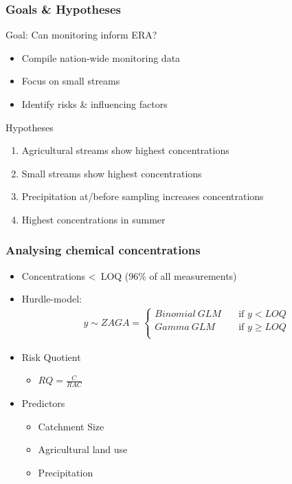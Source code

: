 \documentclass[
	10pt
	]{beamer}
\begin{document}
\begin{frame}
\frametitle{Goals \& Hypotheses}
	\begin{exampleblock}{Goal: Can monitoring inform ERA?}
		\begin{itemize}
			\item Compile nation-wide monitoring data %
			\item Focus on small streams %
			\item Identify risks \& influencing factors
		\end{itemize}
	\end{exampleblock}
	\pause
	\begin{exampleblock}{Hypotheses}
		\begin{enumerate}
			\item Agricultural streams show highest concentrations
			\item Small streams show highest concentrations
			\item Precipitation at/before sampling increases concentrations
			\item Highest concentrations in summer
		\end{enumerate}
	\end{exampleblock}
\end{frame}


\begin{frame}
\frametitle{Analysing chemical concentrations}
	\begin{itemize}
		\pause
		\item Concentrations \textless~LOQ (96\% of all measurements)
		\pause
		\item Hurdle-model: 
			\begin{align*}
			y \sim ZAGA = 
			  \begin{cases}
			    Binomial~GLM   & \quad  \text{if } y < LOQ \\
			    Gamma~GLM & \quad \text{if } y \ge LOQ \\
			  \end{cases}
			\end{align*}
		\pause
		\item Risk Quotient
			\begin{itemize}
				\item \large $RQ = \frac{C}{RAC}$
			\end{itemize}
		\pause
		\item Predictors
		    \begin{itemize}
				\item Catchment Size 
				\item Agricultural land use
				\item Precipitation
			\end{itemize}
	\end{itemize}
\end{frame}
\end{document}
